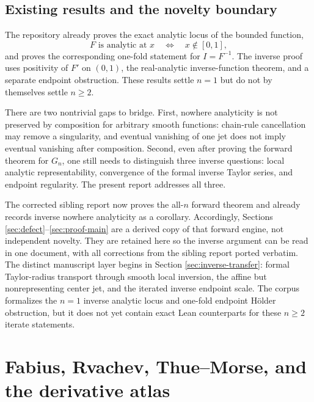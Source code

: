 \documentclass[11pt,oneside]{article}
\theoremstyle{definition}
\theoremstyle{remark}
\begin{document}
\subsection{Existing results and the novelty boundary}

The repository already proves the exact analytic locus of the bounded function,
\begin{equation}
 F\text{ is analytic at }x\quad\Longleftrightarrow\quad x\notin[0,1],
 \label{eq:base-locus}
\end{equation}
and proves the corresponding one-fold statement for $I=F^{-1}$.  The inverse proof
uses positivity of $F'$ on $(0,1)$, the real-analytic inverse-function theorem, and a
separate endpoint obstruction.  These results settle $n=1$ but do not by themselves
settle $n\geq2$.

There are two nontrivial gaps to bridge.  First, nowhere analyticity is not preserved by
composition for arbitrary smooth functions: chain-rule cancellation may remove a
singularity, and eventual vanishing of one jet does not imply eventual vanishing after
composition.  Second, even after proving the forward theorem for $G_n$, one still needs
to distinguish three inverse questions: local analytic representability, convergence
of the formal inverse Taylor series, and endpoint regularity.  The present report
addresses all three.

The corrected sibling report
 now proves the all-$n$
forward theorem and already records inverse nowhere analyticity as a corollary.
Accordingly, Sections \ref{sec:defect}--\ref{sec:proof-main} are a derived copy of that
forward engine, not independent novelty.  They are retained here so the inverse
argument can be read in one document, with all corrections from the sibling report
ported verbatim.  The distinct manuscript layer begins in
Section \ref{sec:inverse-transfer}: formal Taylor-radius transport through smooth local
inversion, the affine but nonrepresenting center jet, and the iterated inverse endpoint
scale.  The corpus formalizes the $n=1$ inverse analytic locus and one-fold endpoint
H\"older obstruction, but it does not yet contain exact Lean counterparts for these
$n\geq2$ iterate statements.

\section{Fabius, Rvachev, Thue--Morse, and the derivative atlas}
\label{sec:background}
\end{document}
